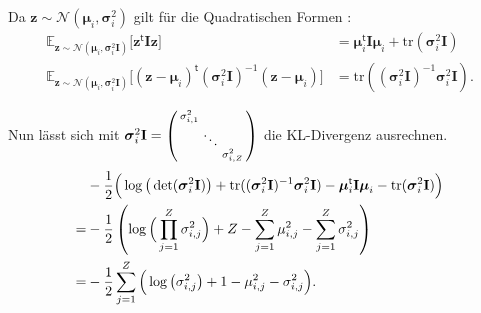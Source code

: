 \documentclass[12pt]{article}
\newcommand{\z}{\mathbf{z}}
\begin{document}
	Da $\z\sim\mathcal{N}(\boldsymbol\mu_{i},\boldsymbol\sigma_{i}^{2})$ gilt für die Quadratischen Formen \cite{matrix}:
	\begin{align*}
	\mathbb{E}_{\z\sim\mathcal{N}(\boldsymbol\mu_{i},\boldsymbol\sigma_{i}^{2}\mathbf{I})}\big[\textbf{z}^{\mathsf{t}}\mathbf{I}\textbf{z}\big] &= \boldsymbol\mu_{i}^{\mathsf{t}}\mathbf{I}\boldsymbol\mu_{i}+\mathrm{tr}(\boldsymbol\sigma_{i}^{2}\mathbf{I})\\ \mathbb{E}_{\z\sim\mathcal{N}(\boldsymbol\mu_{i},\boldsymbol\sigma_{i}^{2}\mathbf{I})}\big[(\textbf{z}-\boldsymbol\mu_{i})^{\mathsf{t}}(\boldsymbol\sigma_{i}^{2}\mathbf{I})^{-1}(\textbf{z}-\boldsymbol\mu_{i})\big] &= \mathrm{tr}((\boldsymbol\sigma_{i}^{2}\mathbf{I})^{-1}\boldsymbol\sigma_{i}^{2}\mathbf{I}).
	\end{align*}


	Nun lässt sich mit ${\boldsymbol\sigma_{i}^{2}\mathbf{I}} =  \begin{psmallmatrix}\sigma_{i,1}^{2} & \ &\ \\ \ & \ddots &\ \\ \ & \ &\sigma_{i,Z}^{2}\end{psmallmatrix}$ die KL-Divergenz ausrechnen.
	\begin{align*}
	&-\frac{1}{2}\Big(\log\big(\det(\boldsymbol\sigma_{i}^{2}\mathbf{I})\big)+\mathrm{tr}((\boldsymbol\sigma_{i}^{2}\mathbf{I})^{-1}\boldsymbol\sigma_{i}^{2}\mathbf{I})-\boldsymbol\mu_{i}^{\mathsf{t}}\textbf{I}\boldsymbol\mu_{i}-\mathrm{tr}(\boldsymbol\sigma_{i}^{2}\mathbf{I})\Big) \notag \\
	= &-\frac{1}{2}\left(\log\Big(\prod_{j=1}^{Z}\sigma_{i,j}^{2}\Big)+Z-\sum_{j=1}^{Z}\mu_{i,j}^{2}-\sum_{j=1}^{Z}\sigma_{i,j}^{2}\right) \notag \\
	= &-\frac{1}{2}\sum_{j=1}^{Z}\Big(\log\big(\sigma_{i,j}^{2}\big)+1-\mu_{i,j}^{2}-\sigma_{i,j}^{2}\Big).
	\end{align*}
\end{document}

